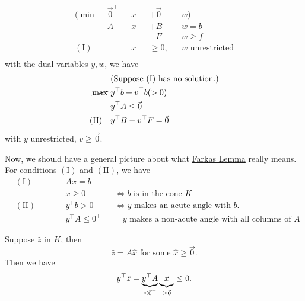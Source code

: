 \begin{eg}
	\[
		\begin{alignedat}{4}
			(\min~            & \vec{0}^{\top} &  & x &  & + \vec{0}^{\top} &  & w)                    \\
			                  & A              &  & x &  & + B              &  & w = b                 \\
			                  &                &  &   &  & -F               &  & w \geq f              \\
			(\mathrm{I})\quad &                &  & x &  & \geq  0,         &  & w\text{ unrestricted} \\
		\end{alignedat}
	\]
	with the \hyperref[def:dual]{dual} variables \(y, w\), we have
	\[
		\begin{aligned}
			                   & (\text{Suppose \((\mathrm{I})\) has no solution.}) \\
			\cancel{\max}~     & y^{\top} b + v^{\top} b (>0)                       \\
			                   & y^{\top} A \leq \vec{0}                            \\
			(\mathrm{II})\quad & y^{\top} B - v^{\top} F = \vec{0}
		\end{aligned}
	\]
	with \(y\) unrestricted, \(v\geq  \vec{0}\).
\end{eg}

Now, we should have a general picture about what \hyperref[lma:Farkas]{Farkas Lemma} really means. For conditions \((\mathrm{I})\) and \((\mathrm{II})\), we have
\[
	\begin{alignedat}{3}
		 & (\mathrm{I}) \qquad  &  & Ax = b                                                                                   \\
		 &                      &  & x\geq 0                &  & \iff b \text{ is in the cone }K                              \\
		 & (\mathrm{II}) \qquad &  & y^{\top}b> 0           &  & \iff y \text{ makes an acute angle with }b.                  \\
		 &                      &  & y^{\top}A\leq 0^{\top} &  & \quad y\text{ makes a non-acute angle with all columns of }A
	\end{alignedat}
\]

Suppose \(\hat{z}\) in \(K\), then
\[
	\hat{z} = A \hat{x} \text{ for some }\hat{x} \geq  \vec{0}.
\]
Then we have
\[
	y^{\top} \hat{z} = \underbrace{y^{\top} A}_{\leq\vec{0}^{\top}} \underbrace{\vphantom{y}\vec{x}}_{\geq  \vec{0}}  \leq 0.
\]

